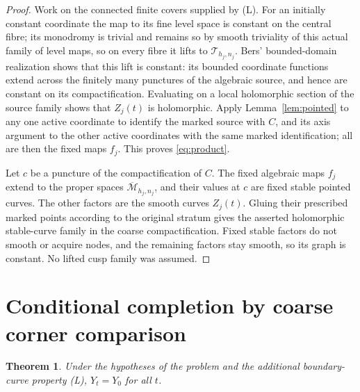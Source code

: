 \documentclass[11pt]{article}
\newcommand{\M}{\mathcal M}
\newcommand{\T}{\mathcal T}
\newcommand{\cl}[1]{\overline{#1}}
\newtheorem{theorem}{Theorem}
\theoremstyle{remark}
\begin{document}
\begin{proof}
Work on the connected finite covers supplied by (L). For an
initially constant coordinate the map to its fine level space is
constant on the central fibre; its monodromy is trivial and
remains so by smooth triviality of this actual family of level
maps, so on every fibre it lifts to \(\T_{h_j,n_j}\).
Bers' bounded-domain realization
\cite[Section 6]{BersFinite} shows that this lift
is constant: its bounded coordinate functions extend across the
finitely many punctures of the algebraic source, and hence are
constant on its compactification. Evaluating on a local
holomorphic section of the source family shows that
\(Z_j(t)\) is holomorphic.
Apply Lemma~\ref{lem:pointed} to any one active coordinate to
identify the marked source with \(C\), and its axis argument
to the other active coordinates with the same marked
identification; all are then the fixed maps \(f_j\). This proves
\eqref{eq:product}.

Let \(c\) be a puncture of the compactification of \(C\).
The fixed algebraic maps \(f_j\) extend to the proper spaces
\(\cl{\M}_{h_j,n_j}\), and their values at \(c\) are fixed stable
pointed curves. The other factors are the smooth curves \(Z_j(t)\).
Gluing their prescribed marked points according to the original
stratum gives the asserted holomorphic stable-curve family
in the coarse compactification. Fixed stable factors do not
smooth or acquire nodes, and the remaining factors stay smooth,
so its graph is constant. No lifted cusp family was assumed.
\end{proof}

\section{Conditional completion by coarse corner comparison}\label{sec:conditional}

\begin{theorem}\label{thm:conditional}
Under the hypotheses of the problem and the additional
boundary-curve property (L), \(Y_t=Y_0\) for all \(t\).
\end{theorem}
\end{document}
